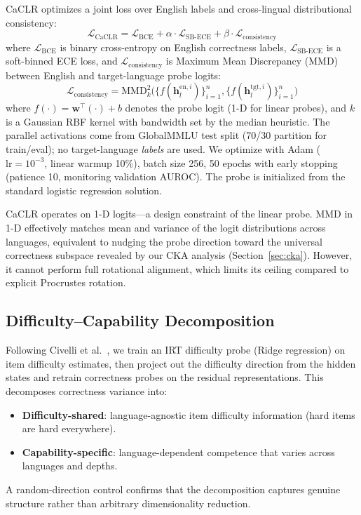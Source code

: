 \documentclass[11pt,a4paper]{article}
\begin{document}
CaCLR optimizes a joint loss over English labels and cross-lingual distributional consistency:
\begin{equation}
\mathcal{L}_{\text{CaCLR}} = \mathcal{L}_{\text{BCE}} + \alpha \cdot \mathcal{L}_{\text{SB-ECE}} + \beta \cdot \mathcal{L}_{\text{consistency}}
\end{equation}
where $\mathcal{L}_{\text{BCE}}$ is binary cross-entropy on English correctness labels, $\mathcal{L}_{\text{SB-ECE}}$ is a soft-binned ECE loss, and $\mathcal{L}_{\text{consistency}}$ is Maximum Mean Discrepancy (MMD) between English and target-language probe logits:
\begin{equation}
\mathcal{L}_{\text{consistency}} = \text{MMD}^2_k\big(\{f(\mathbf{h}_l^{\text{en},i})\}_{i=1}^n, \{f(\mathbf{h}_l^{\text{tgt},i})\}_{i=1}^n\big)
\end{equation}
where $f(\cdot) = \mathbf{w}^\top(\cdot) + b$ denotes the probe logit (1-D for linear probes), and $k$ is a Gaussian RBF kernel with bandwidth set by the median heuristic. The parallel activations come from GlobalMMLU test split (70/30 partition for train/eval); no target-language \emph{labels} are used. We optimize with Adam ($\text{lr}=10^{-3}$, linear warmup 10\%), batch size 256, 50 epochs with early stopping (patience 10, monitoring validation AUROC). The probe is initialized from the standard logistic regression solution.

CaCLR operates on 1-D logits---a design constraint of the linear probe. MMD in 1-D effectively matches mean and variance of the logit distributions across languages, equivalent to nudging the probe direction toward the universal correctness subspace revealed by our CKA analysis (Section~\ref{sec:cka}). However, it cannot perform full rotational alignment, which limits its ceiling compared to explicit Procrustes rotation.

\subsection{Difficulty--Capability Decomposition}
\label{sec:method:decomposition}

Following Civelli et al.\ \cite{civelli2024crosslingual}, we train an IRT difficulty probe (Ridge regression) on item difficulty estimates, then project out the difficulty direction from the hidden states and retrain correctness probes on the residual representations. This decomposes correctness variance into:
\begin{itemize}
\item \textbf{Difficulty-shared}: language-agnostic item difficulty information (hard items are hard everywhere).
\item \textbf{Capability-specific}: language-dependent competence that varies across languages and depths.
\end{itemize}
A random-direction control confirms that the decomposition captures genuine structure rather than arbitrary dimensionality reduction.
\end{document}
